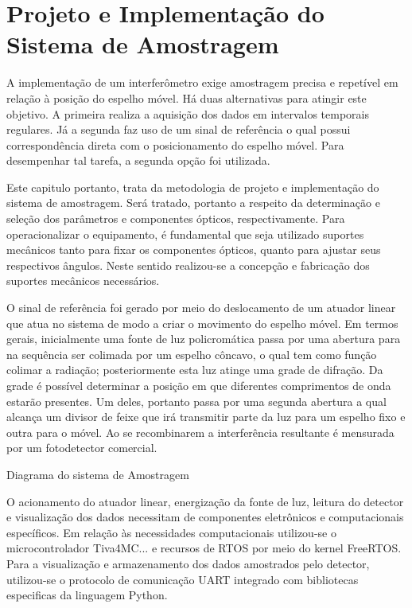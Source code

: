 \documentclass[oneside,openright,12pt]{ufsm_2021} %
\begin{document}
\chapter{Projeto e Implementação do Sistema de Amostragem}
\label{cap:SisAmostragem}
    \par A implementação de um interferômetro exige amostragem precisa e repetível \cite{MIT} em relação à posição do espelho móvel. Há duas alternativas para atingir este objetivo. A primeira realiza a aquisição dos dados em intervalos temporais regulares. Já a segunda faz uso de um sinal de referência o qual possui correspondência direta com o posicionamento do espelho móvel. Para desempenhar tal tarefa, a segunda opção foi utilizada.
    \par Este capitulo portanto, trata da metodologia de projeto e implementação do sistema de amostragem. Será tratado, portanto a respeito da determinação e seleção dos parâmetros e componentes ópticos, respectivamente. Para operacionalizar o equipamento, é fundamental que seja utilizado suportes mecânicos tanto para fixar os componentes ópticos, quanto para ajustar seus respectivos ângulos. Neste sentido realizou-se a concepção e fabricação dos suportes mecânicos necessários.
    \par O sinal de referência foi gerado por meio do deslocamento de um atuador linear que atua no sistema de modo a criar o movimento do espelho móvel. Em termos gerais, inicialmente uma fonte de luz policromática passa por uma abertura para na sequência ser colimada por um espelho côncavo, o qual tem como função colimar a radiação; posteriormente esta luz atinge uma grade de difração. Da grade é possível determinar a posição em que diferentes comprimentos de onda estarão presentes. Um deles, portanto passa por uma segunda abertura a qual alcança um divisor de feixe que irá transmitir parte da luz para um espelho fixo e outra para o móvel. Ao se recombinarem a interferência resultante é mensurada por um fotodetector comercial.
    \par Diagrama do sistema de Amostragem
    \par O acionamento do atuador linear, energização da fonte de luz, leitura do detector e visualização dos dados necessitam de componentes eletrônicos e computacionais específicos. Em relação às necessidades computacionais utilizou-se o microcontrolador Tiva4MC... e recursos de RTOS por meio do kernel FreeRTOS. Para a visualização e armazenamento dos dados amostrados pelo detector, utilizou-se o protocolo de comunicação UART integrado com bibliotecas especificas da linguagem Python.
    
\end{document}
